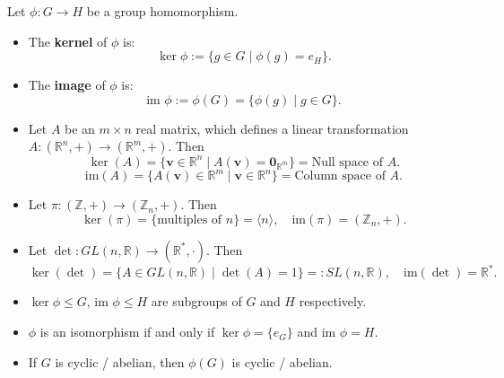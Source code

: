\begin{definition}
Let $\phi : G \to H$ be a group homomorphism.
\begin{itemize}
    \item The \textbf{kernel} of $\phi$ is: 
    $$\ker \phi := \{ g \in G \mid \phi(g) = e_H \}.$$
    \item The \textbf{image} of $\phi$ is: 
    $$\text{im } \phi := \phi(G) = \{ \phi(g) \mid g \in G \}.$$
\end{itemize}
\end{definition}
\begin{example}
\begin{itemize}
    \item Let $A$ be an $m \times n$ real matrix, which defines a linear transformation  $A: (\mathbb{R}^n, +) \to (\mathbb{R}^m, +)$. Then $$\ker(A) = \{ \mathbf{v} \in \mathbb{R}^n \mid A(\mathbf{v}) = \mathbf{0}_{\mathbb{R}^m} \} = \text{Null space of } A.$$
    $$\text{im}(A) = \{ A(\mathbf{v}) \in \mathbb{R}^m \mid \mathbf{v} \in \mathbb{R}^n \} = \text{Column space of } A.$$
    
    \item Let $\pi : (\mathbb{Z}, +) \to (\mathbb{Z}_n, +)$. Then 
    $$\ker(\pi) = \{ \text{multiples of } n \} = \langle n \rangle, \quad \text{im}(\pi) = (\mathbb{Z}_n, +).$$
    
    \item Let $\det : GL(n, \mathbb{R}) \to (\mathbb{R}^*, \cdot)$. Then
    $$\ker(\det) = \{ A \in GL(n, \mathbb{R}) \mid \det(A) = 1 \} =: SL(n, \mathbb{R}), \quad \text{im}(\det) = \mathbb{R}^*.$$
\end{itemize}
\end{example}
\begin{proposition}
\begin{itemize}
\item[(a)] $\ker \phi \le G$, $\text{im } \phi \le H$ are subgroups of $G$ and $H$ respectively.
\item[(b)] $\phi$ is an isomorphism if and only if $\ker \phi = \{e_G\}$ and $\text{im } \phi = H$.
\item[(c)] If $G$ is cyclic / abelian, then $\phi(G)$ is cyclic / abelian.
\end{itemize}
\end{proposition}


